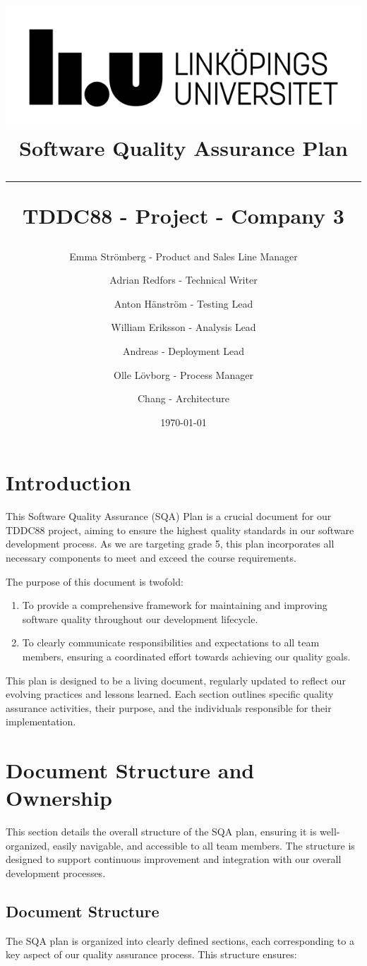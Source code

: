 \documentclass{article}
\title{
\includegraphics[scale=1.5]{liu_logga.png} \\
\vspace{2.0cm} \textbf{Software Quality Assurance Plan} \\
 \endgraf\rule{\textwidth}{.4pt}
  \large \textbf{TDDC88 - Project - Company 3}\\
   }
\author{
    Emma Strömberg - Product and Sales Line Manager \and 
    Adrian Redfors - Technical Writer \and 
    Anton Hänström - Testing Lead \and 
    William Eriksson - Analysis Lead \and 
    Andreas - Deployment Lead \and 
    Olle Lövborg - Process Manager \and 
    Chang - Architecture
}
\date{\today}
\begin{document}
\maketitle

\newpage
\tableofcontents
\newpage

\section{Introduction}
This Software Quality Assurance (SQA) Plan is a crucial document for our TDDC88 project, aiming to ensure the highest quality standards in our software development process. As we are targeting grade 5, this plan incorporates all necessary components to meet and exceed the course requirements.

The purpose of this document is twofold:
\begin{enumerate}
    \item To provide a comprehensive framework for maintaining and improving software quality throughout our development lifecycle.
    \item To clearly communicate responsibilities and expectations to all team members, ensuring a coordinated effort towards achieving our quality goals.
\end{enumerate}

This plan is designed to be a living document, regularly updated to reflect our evolving practices and lessons learned. Each section outlines specific quality assurance activities, their purpose, and the individuals responsible for their implementation.

\newpage
\section{Document Structure and Ownership}

This section details the overall structure of the SQA plan, ensuring it is well-organized, easily navigable, and accessible to all team members. The structure is designed to support continuous improvement and integration with our overall development processes.

\subsection{Document Structure}
The SQA plan is organized into clearly defined sections, each corresponding to a key aspect of our quality assurance process. This structure ensures:
\end{document}
